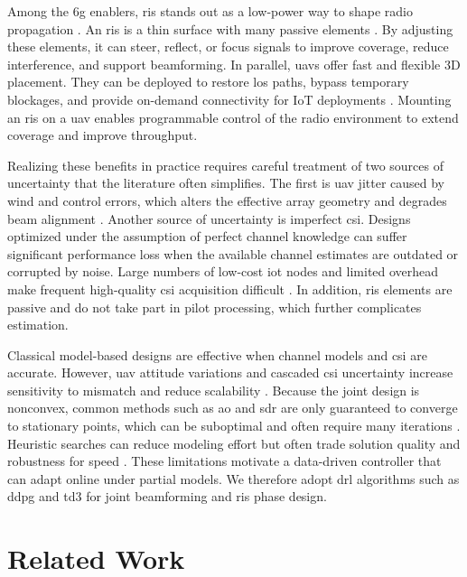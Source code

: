 Among the \gls{6g} enablers, \gls{ris} stands out as a low-power way to shape radio propagation \cite{salim2025cooperative}. An \gls{ris} is a thin surface with many passive elements \cite{bjornson2022spm}. By adjusting these elements, it can steer, reflect, or focus signals to improve coverage, reduce interference, and support beamforming. In parallel, \glspl{uav} offer fast and flexible 3D placement. They can be deployed to restore \gls{los} paths, bypass temporary blockages, and provide on-demand connectivity for IoT deployments \cite{cheng2023ai}. Mounting an \gls{ris} on a \gls{uav} enables programmable control of the radio environment to extend coverage and improve throughput.

Realizing these benefits in practice requires careful treatment of two sources of uncertainty that the literature often simplifies. The first is \gls{uav} jitter caused by wind and control errors, which alters the effective array geometry and degrades beam alignment \cite{yuan2020jittering}. Another source of uncertainty is imperfect \gls{csi}. Designs optimized under the assumption of perfect channel knowledge can suffer significant performance loss when the available channel estimates are outdated or corrupted by noise. Large numbers of low-cost \gls{iot} nodes and limited overhead make frequent high-quality \gls{csi} acquisition difficult \cite{zheng2022survey}. In addition, \gls{ris} elements are passive and do not take part in pilot processing, which further complicates estimation.

Classical model-based designs are effective when channel models and \gls{csi} are accurate. However, \gls{uav} attitude variations and cascaded \gls{csi} uncertainty increase sensitivity to mismatch and reduce scalability \cite{shamasundar2023channel}. Because the joint design is nonconvex, common methods such as \gls{ao} and \gls{sdr} are only guaranteed to converge to stationary points, which can be suboptimal and often require many iterations \cite{wu2021tutorial}. Heuristic searches can reduce modeling effort but often trade solution quality and robustness for speed \cite{zhou2023survey}. These limitations motivate a data-driven controller that can adapt online under partial models. We therefore adopt \gls{drl} algorithms such as \gls{ddpg} and \gls{td3} for joint beamforming and \gls{ris} phase design.


\section{Related Work}
\label{sec:related_work}

